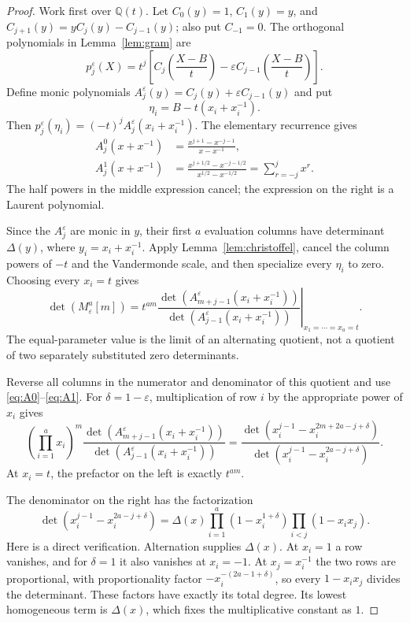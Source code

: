 \documentclass[11pt]{article}
\theoremstyle{definition}
\theoremstyle{remark}
\newcommand{\Q}{\mathbb Q}
\newcommand{\Dlt}{\Delta}
\newcommand{\eps}{\varepsilon}
\theoremstyle{definition}
\theoremstyle{plain}
\numberwithin{equation}{section}
\begin{document}
\begin{proof}
Work first over $\Q(t)$. Let $C_0(y)=1$, $C_1(y)=y$, and
$C_{j+1}(y)=yC_j(y)-C_{j-1}(y)$; also put $C_{-1}=0$.
The orthogonal polynomials in Lemma~\ref{lem:gram} are
\[
 p_j^\eps(X)=t^j\left[C_j\left(\frac{X-B}{t}\right)
 -\eps C_{j-1}\left(\frac{X-B}{t}\right)\right].
\]
Define monic polynomials $A_j^\eps(y)=C_j(y)+\eps C_{j-1}(y)$ and put
\[
 \eta_i=B-t(x_i+x_i^{-1}).
\]
Then $p_j^\eps(\eta_i)=(-t)^jA_j^\eps(x_i+x_i^{-1})$.
The elementary recurrence gives
\begin{align}
 A_j^0(x+x^{-1})&=\frac{x^{j+1}-x^{-j-1}}{x-x^{-1}},\label{eq:A0}\\
 A_j^1(x+x^{-1})&=\frac{x^{j+1/2}-x^{-j-1/2}}
 {x^{1/2}-x^{-1/2}}=\sum_{r=-j}^{j}x^r.\label{eq:A1}
\end{align}
The half powers in the middle expression cancel; the expression on the
right is a Laurent polynomial.

Since the $A_j^\eps$ are monic in $y$, their first $a$ evaluation columns
have determinant $\Dlt(y)$, where $y_i=x_i+x_i^{-1}$.
Apply Lemma~\ref{lem:christoffel}, cancel the column powers of $-t$ and
the Vandermonde scale, and then specialize every $\eta_i$ to zero.
Choosing every $x_i=t$ gives
\begin{equation}
 \det(M_\eps^a[m])=
 t^{am}\left.
 \frac{\det(A_{m+j-1}^\eps(x_i+x_i^{-1}))}
 {\det(A_{j-1}^\eps(x_i+x_i^{-1}))}
 \right|_{x_1=\cdots=x_a=t}.
 \label{eq:character-step}
\end{equation}
The equal-parameter value is the limit of an alternating quotient, not a
quotient of two separately substituted zero determinants.

Reverse all columns in the numerator and denominator of this quotient and
use \eqref{eq:A0}--\eqref{eq:A1}. For $\delta=1-\eps$, multiplication
of row $i$ by the appropriate power of $x_i$ gives
\begin{equation}
 \left(\prod_{i=1}^a x_i\right)^m
 \frac{\det(A_{m+j-1}^\eps(x_i+x_i^{-1}))}
 {\det(A_{j-1}^\eps(x_i+x_i^{-1}))}
 =
 \frac{\det(x_i^{j-1}-x_i^{2m+2a-j+\delta})}
 {\det(x_i^{j-1}-x_i^{2a-j+\delta})}.
 \label{eq:alternant-ratio}
\end{equation}
At $x_i=t$, the prefactor on the left is exactly $t^{am}$.

The denominator on the right has the factorization
\begin{equation}
 \det(x_i^{j-1}-x_i^{2a-j+\delta})
 =\Dlt(x)\prod_{i=1}^a(1-x_i^{1+\delta})
 \prod_{i<j}(1-x_ix_j).
 \label{eq:den-factor}
\end{equation}
Here is a direct verification. Alternation supplies $\Dlt(x)$.
At $x_i=1$ a row vanishes, and for $\delta=1$ it also vanishes at $x_i=-1$.
At $x_j=x_i^{-1}$ the two rows are proportional, with proportionality
factor $-x_i^{-(2a-1+\delta)}$, so every $1-x_ix_j$ divides the determinant.
These factors have exactly its total degree. Its lowest homogeneous term
is $\Dlt(x)$, which fixes the multiplicative constant as $1$.


\end{proof}
\end{document}
